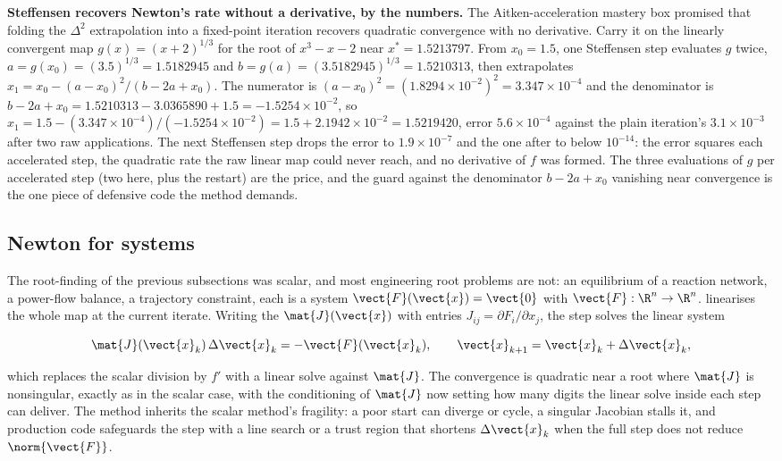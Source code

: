 \begin{example}
\textbf{Steffensen recovers Newton's rate without a derivative, by the
numbers.} The Aitken-acceleration mastery box promised that folding the
$\Delta^{2}$ extrapolation into a fixed-point iteration recovers quadratic
convergence with no derivative. Carry it on the linearly convergent map
$g(x) = (x + 2)^{1/3}$ for the root of $x^{3} - x - 2$ near $x^{*} =
1.5213797$. From $x_{0} = 1.5$, one Steffensen step evaluates $g$ twice,
$a = g(x_{0}) = (3.5)^{1/3} = 1.5182945$ and $b = g(a) = (3.5182945)^{1/3} =
1.5210313$, then extrapolates $x_{1} = x_{0} - (a - x_{0})^{2}/(b - 2a +
x_{0})$. The numerator is $(a - x_{0})^{2} = (1.8294 \times 10^{-2})^{2} =
3.347 \times 10^{-4}$ and the denominator is $b - 2a + x_{0} = 1.5210313 -
3.0365890 + 1.5 = -1.5254 \times 10^{-2}$, so $x_{1} = 1.5 - (3.347 \times
10^{-4})/(-1.5254 \times 10^{-2}) = 1.5 + 2.1942 \times 10^{-2} = 1.5219420$,
error $5.6 \times 10^{-4}$ against the plain iteration's $3.1 \times 10^{-3}$
after two raw applications. The next Steffensen step drops the error to $1.9
\times 10^{-7}$ and the one after to below $10^{-14}$: the error squares each
accelerated step, the quadratic rate the raw linear map could never reach, and
no derivative of $f$ was formed. The three evaluations of $g$ per accelerated
step (two here, plus the restart) are the price, and the guard against the
denominator $b - 2a + x_{0}$ vanishing near convergence is the one piece of
defensive code the method demands.
\end{example}

\subsection{Newton for systems}

The root-finding of the previous subsections was scalar, and most
engineering root problems are not: an equilibrium of a reaction network, a
power-flow balance, a trajectory constraint, each is a system $\vect{F}
(\vect{x}) = \vect{0}$ with $\vect{F}: \R^{n} \to \R^{n}$.  linearises the whole map at the current iterate. Writing the
 $\mat{J}(\vect{x})$ with entries $J_{ij} = \partial F_{i}
/ \partial x_{j}$, the step solves the linear system

\[
\mat{J}(\vect{x}_{k})\, \Delta\vect{x}_{k} = -\vect{F}(\vect{x}_{k}),
\qquad \vect{x}_{k+1} = \vect{x}_{k} + \Delta\vect{x}_{k},
\]

which replaces the scalar division by $f'$ with a linear solve against
$\mat{J}$. The convergence is quadratic near a root where $\mat{J}$ is
nonsingular, exactly as in the scalar case, with the conditioning of
$\mat{J}$ now setting how many digits the linear solve inside each step can
deliver. The method inherits the scalar method's fragility: a poor start can
diverge or cycle, a singular Jacobian stalls it, and production code
safeguards the step with a line search or a trust region that shortens
$\Delta\vect{x}_{k}$ when the full step does not reduce $\norm{\vect{F}}$.

